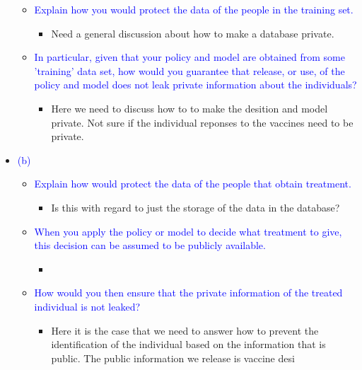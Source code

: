 \begin{itemize}
\begin{itemize}
            \item \textcolor{blue}{Explain how you would protect the data of the people in the training set.}
                \begin{itemize}
                    \item Need a general discussion about how to make a database private.  
                \end{itemize}
            \item \textcolor{blue}{In particular, given that your policy and model are obtained from some 'training' data set, how would you guarantee that release, or use, of the policy and model does not leak private information about the individuals?}
                \begin{itemize}
                    \item Here we need to discuss how to to make the desition and model private. 
                    Not sure if the individual reponses to the vaccines need to be private. 
                \end{itemize}
        \end{itemize}
    \item \textcolor{blue}{(b)}
        \begin{itemize}
            \item \textcolor{blue}{Explain how would protect the data of the people that obtain treatment.}
                \begin{itemize}
                    \item Is this with regard to just the storage of the data in the database?
                \end{itemize}
            \item \textcolor{blue}{When you apply the policy or model to decide what treatment to give, this decision can be assumed to be publicly available.}
                \begin{itemize}
                    \item 
                \end{itemize}
            \item \textcolor{blue}{How would you then ensure that the private information of the treated individual is not leaked?}
                \begin{itemize}
                    \item Here it is the case that we need to answer how to prevent the identification of the individual based on the information that is public. 
                    The public information we release is vaccine desi

\end{itemize}
\end{itemize}
\end{itemize}
